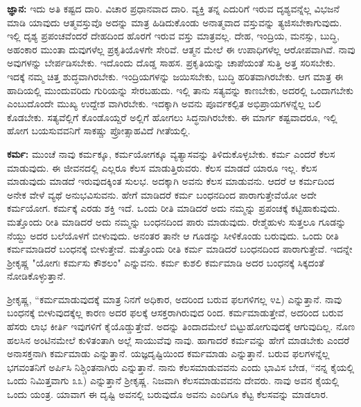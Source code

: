 \textbf{ಜ್ಞಾನ:} ಇದು ಅತಿ ಕಷ್ಟದ ದಾರಿ. ವಿಚಾರ ಪ್ರಧಾನವಾದ ದಾರಿ. ವ್ಯಕ್ತಿ ತನ್ನ ಎದುರಿಗೆ ಇರುವ ದೃಶ್ಯವನ್ನೆಲ್ಲ ವಿಭಜನೆ ಮಾಡಿ ಯಾವುದು ಆತ್ಮವಸ್ತುವೊ ಅದನ್ನು ಮಾತ್ರ ಹಿಡಿದುಕೊಂಡು ಅನಾತ್ಮವಾದ ವಸ್ತುವನ್ನು ತ್ಯಜಿಸಬೇಕಾಗುವುದು. ಇಲ್ಲಿ ದೃಶ್ಯ ಪ್ರಪಂಚವೆಂದರೆ ದೇಹದಿಂದ ಹೊರಗೆ ಇರುವ ವಸ್ತು ಮಾತ್ರವಲ್ಲ. ದೇಹ, ಇಂದ್ರಿಯ, ಮನಸ್ಸು, ಬುದ್ಧಿ, ಅಹಂಕಾರ ಮುಂತಾ ದುವುಗಳೆಲ್ಲ ಪ್ರಕೃತಿಯೊಳಗೇ ಸೇರಿವೆ. ಆತ್ಮನ ಮೇಲೆ ಈ ಉಪಾಧಿಗಳೆಲ್ಲ ಆರೋಪವಾಗಿವೆ. ನಾವು ಅವುಗಳನ್ನು ಬೇರ್ಪಡಿಸಬೇಕು. ಇದೊಂದು ದೊಡ್ಡ ಸಾಹಸ. ಪ್ರಕೃತಿಯನ್ನು ಚಾಪೆಯಂತೆ ಸುತ್ತಿ ಅತ್ತ ಸರಿಸಬೇಕು. ಇದಕ್ಕೆ ನಮ್ಮ ಚಿತ್ತ ಶುದ್ಧವಾಗಿರಬೇಕು. ಇಂದ್ರಿಯಗಳನ್ನು ಜಯಿಸಬೇಕು, ಬುದ್ಧಿ ಹರಿತವಾಗಿರಬೇಕು. ಆಗ ಮಾತ್ರ ಈ ಹಾದಿಯಲ್ಲಿ ಮುಂದುವರಿದು ಗುರಿಯನ್ನು ಸೇರಬಹುದು. ಇಲ್ಲಿ ತಾನು ಸತ್ಯವನ್ನು ಕಾಣಬೇಕು, ಅದರಲ್ಲಿ ಒಂದಾಗಬೇಕು ಎಂಬುದೊಂದೇ ಮುಖ್ಯ ಉದ್ದೇಶ ವಾಗಿರಬೇಕು. ಇದಕ್ಕಾಗಿ ಅವನು ಪೂರ್ವಕಲ್ಪಿತ ಅಭಿಪ್ರಾಯಗಳನ್ನೆಲ್ಲ ಬಲಿ ಕೊಡಬೇಕು. ಸತ್ಯವೆಲ್ಲಿಗೆ ಕೊಂಡೊಯ್ದರೆ ಅಲ್ಲಿಗೆ ಹೋಗಲು ಸಿದ್ಧನಾಗಿರಬೇಕು. ಈ ಮಾರ್ಗ ಕಷ್ಟವಾದರೂ, ಇಲ್ಲಿ ಹೋಗ ಬಯಸುವವನಿಗೆ ಸಾಕಷ್ಚು ಪ್ರೋತ್ಸಾಹವಿದೆ ಗೀತೆಯಲ್ಲಿ.

\textbf{ಕರ್ಮ:} ಮುಂಚೆ ನಾವು ಕರ್ಮಕ್ಕೂ, ಕರ್ಮಯೋಗಕ್ಕೂ ವ್ಯತ್ಯಾಸವನ್ನು ತಿಳಿದುಕೊಳ್ಳಬೇಕು. ಕರ್ಮ ಎಂದರೆ ಕೆಲಸ ಮಾಡುವುದು. ಈ ಜೀವನದಲ್ಲಿ ಎಲ್ಲರೂ ಕೆಲಸ ಮಾಡುತ್ತಿರುವರು. ಕೆಲಸ ಮಾಡದೆ ಯಾರೂ ಇಲ್ಲ. ಕೆಲಸ ಮಾಡುವುದು ಮಾಡದೆ ಇರುವುದಕ್ಕಿಂತ ಸುಲಭ. ಅದಕ್ಕಾಗಿ ಅವನು ಕೆಲಸ ಮಾಡುವನು. ಆದರೆ ಆ ಕರ್ಮದಿಂದ ಅನೇಕ ವೇಳೆ ವ್ಯಥೆ ಅನುಭವಿಸುವನು. ಹೇಗೆ ಮಾಡಿದರೆ ಕರ್ಮ ಬಂಧನದಿಂದ ಪಾರಾಗುತ್ತೇವೆಯೋ ಅದೇ ಕರ್ಮಯೋಗ. ಕರ್ಮಕ್ಕೆ ಎರಡು ಶಕ್ತಿ ಇದೆ. ಒಂದು ರೀತಿ ಮಾಡಿದರೆ ಅದು ನಮ್ಮನ್ನು ಪ್ರಪಂಚಕ್ಕೆ ಕಟ್ಟಿಹಾಕುವುದು. ಮತ್ತೊಂದು ರೀತಿ ಮಾಡಿದರೆ ಅದು ನಮ್ಮನ್ನು ಬಂಧನದಿಂದ ಪಾರು ಮಾಡುವುದು. ರೇಶ್ಮೆಹುಳು ಸುತ್ತಲೂ ಗೂಡನ್ನು ನೆಯ್ದು ಅದರ ಬಲೆಯೊಳಗೆ ಬೀಳುವುದು. ಅನಂತರ ತಾನೇ ಆ ಗೂಡನ್ನು ಸೀಳಿಕೊಂಡು ಬರುವುದು. ಒಂದು ರೀತಿ ಕರ್ಮಮಾಡಿದರೆ ಬಂಧನಕ್ಕೆ ಬೀಳುತ್ತೇವೆ. ಮತ್ತೊಂದು ರೀತಿ ಕರ್ಮ ಮಾಡಿದರೆ ಬಂಧನದಿಂದ ಪಾರಾಗುತ್ತೇವೆ. ಇದನ್ನೇ ಶ್ರೀಕೃಷ್ಣ "ಯೋಗಃ ಕರ್ಮಸು ಕೌಶಲಂ" ಎನ್ನುವನು. ಕರ್ಮ ಕುಶಲಿ ಕರ್ಮಮಾಡಿ ಅದರ ಬಂಧನಕ್ಕೆ ಸಿಕ್ಕದಂತೆ ನೋಡಿಕೊಳ್ಳುತ್ತಾನೆ.

ಶ್ರೀಕೃಷ್ಣ, “ಕರ್ಮಮಾಡುವುದಕ್ಕೆ ಮಾತ್ರ ನಿನಗೆ ಅಧಿಕಾರ, ಅದರಿಂದ ಬರುವ ಫಲಗಳಿಗಲ್ಲ ೪೭) ಎನ್ನುತ್ತಾನೆ. ನಾವು ಬಂಧನಕ್ಕೆ ಬೀಳುವುದಕ್ಕೆಲ್ಲ ಕಾರಣ ಅದರ ಫಲಕ್ಕೆ ಆಸಕ್ತರಾಗಿರುವುದ ರಿಂದ. ಕರ್ಮಮಾಡುತ್ತೇವೆ, ಅದರಿಂದ ಬರುವ ಹೆಸರು ಲಾಭ ಕೀರ್ತಿ ಇವುಗಳಿಗೆ ಕೈಯೊಡ್ಡುತ್ತೇವೆ. ಅದನ್ನು ತಿಂದಾದಮೇಲೆ ಬಿಟ್ಟುಹೋಗುವುದಕ್ಕೆ ಆಗುವುದಿಲ್ಲ. ನೊಣ ಹಲಸಿನ ಅಂಟಿನಮೇಲೆ ಕುಳಿತಂತಾಗಿ ಅಲ್ಲೆ ಸಾಯುವೆವು ನಾವು. ಹಾಗಾದರೆ ಕರ್ಮವನ್ನು ಹೇಗೆ ಮಾಡಬೇಕು ಎಂದರೆ ಅನಾಸಕ್ತನಾಗಿ ಕರ್ಮಮಾಡು ಎನ್ನುತ್ತಾನೆ. ಯಜ್ಞದೃಷ್ಟಿಯಿಂದ ಕರ್ಮಮಾಡು ಎನ್ನುತ್ತಾನೆ. ಬರುವ ಫಲಗಳನ್ನೆಲ್ಲ ಭಗವಂತನಿಗೆ ಅರ್ಪಿಸಿ ನಿಶ್ಚಿಂತನಾಗಿರು ಎನ್ನುತ್ತಾನೆ. ನಾನು ಕೆಲಸಮಾಡುವವನು ಎಂದು ಭಾವಿಸ ಬೇಡ, “ನನ್ನ ಕೈಯಲ್ಲಿ ಒಂದು ನಿಮಿತ್ತವಾಗು ೩೩) ಎನ್ನುತ್ತಾನೆ ಶ್ರೀಕೃಷ್ಣ. ನಿಜವಾಗಿ ಕೆಲಸಮಾಡುವವನು ದೇವರು. ನಾವು ಅವನ ಕೈಯಲ್ಲಿ ಒಂದು ಯಂತ್ರ. ಯಾವಾಗ ಈ ದೃಷ್ಟಿ ಅವನಲ್ಲಿ ಬರುವುದೊ ಅವನು ಎಂದಿಗೂ ಕೆಟ್ಟ ಕೆಲಸವನ್ನು ಮಾಡಲಾರ.


